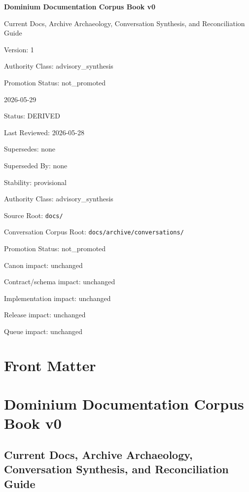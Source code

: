 \documentclass[10.5pt,a4paper]{book}
\begin{document}
\frontmatter
\begin{titlepage}
\centering
\vspace*{1.8cm}
{\Huge\bfseries Dominium Documentation Corpus Book v0\par}
\vspace{0.7cm}
{\Large Current Docs, Archive Archaeology, Conversation Synthesis, and Reconciliation Guide\par}
\vspace{1.1cm}
{\large Version: 1\par}
{\large Authority Class: advisory\_synthesis\par}
{\large Promotion Status: not\_promoted\par}
\vfill
{\large 2026-05-29\par}
\end{titlepage}
\tableofcontents
\mainmatter
Status: DERIVED

Last Reviewed: 2026-\allowbreak{}05-\allowbreak{}28

Supersedes: none

Superseded By: none

Stability: provisional

Authority Class: advisory\_\allowbreak{}synthesis

Source Root: \texttt{docs/\allowbreak{}}

Conversation Corpus Root: \texttt{docs/\allowbreak{}archive/\allowbreak{}conversations/\allowbreak{}}

Promotion Status: not\_\allowbreak{}promoted

Canon impact: unchanged

Contract/\allowbreak{}schema impact: unchanged

Implementation impact: unchanged

Release impact: unchanged

Queue impact: unchanged


\part{Front Matter}

\part{Dominium Documentation Corpus Book v0}

\chapter{Current Docs, Archive Archaeology, Conversation Synthesis, and Reconciliation Guide}
\end{document}
